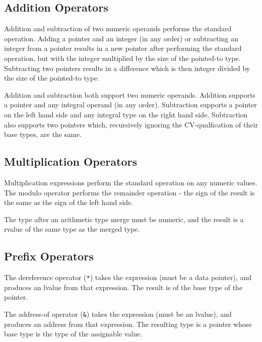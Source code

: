 \documentclass[letterpaper,12pt]{book}
\begin{document}
\subsection{Addition Operators}



Addition and subtraction of two numeric operands performs the standard operation. Adding a pointer and an integer (in any order) or subtracting an integer from a pointer results in a new pointer after performing the standard operation, but with the integer multiplied by the size of the pointed-to type. Subtracting two pointers results in a difference which is then integer divided by the size of the pointed-to type.

Addition and subtraction both support two numeric operands. Addition supports a pointer and any integral operand (in any order). Subtraction supports a pointer on the left hand side and any integral type on the right hand side. Subtraction also supports two pointers which, recursively ignoring the CV-qualfication of their base types, are the same.

\subsection{Multiplication Operators}



Multiplication expressions perform the standard operation on any numeric values. The modulo operator performs the remainder operation - the sign of the result is the same as the sign of the left hand side.

The type after an arithmetic type merge must be numeric, and the result is a rvalue of the same type as the merged type.

\subsection{Prefix Operators}



The dereference operator (\texttt{*}) takes the expression (must be a data pointer), and produces an lvalue from that expression. The result is of the base type of the pointer.

The address-of operator (\texttt{\&}) takes the expression (must be an lvalue), and produces an address from that expression. The resulting type is a pointer whose base type is the type of the assignable value.
\end{document}
